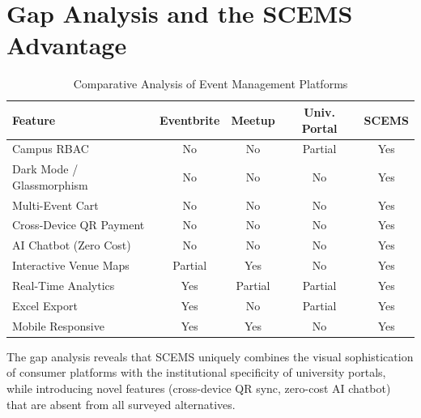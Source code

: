 \documentclass[12pt,a4paper]{report}
\begin{document}
\section{Gap Analysis and the SCEMS Advantage}

\begin{table}[H]
\centering
\caption{Comparative Analysis of Event Management Platforms}
\label{tab:gap_analysis}
\begin{tabular}{|l|c|c|c|c|}
\hline
\textbf{Feature} & \textbf{Eventbrite} & \textbf{Meetup} & \textbf{Univ. Portal} & \textbf{SCEMS} \\
\hline
Campus RBAC & No & No & Partial & Yes \\
\hline
Dark Mode / Glassmorphism & No & No & No & Yes \\
\hline
Multi-Event Cart & No & No & No & Yes \\
\hline
Cross-Device QR Payment & No & No & No & Yes \\
\hline
AI Chatbot (Zero Cost) & No & No & No & Yes \\
\hline
Interactive Venue Maps & Partial & Yes & No & Yes \\
\hline
Real-Time Analytics & Yes & Partial & Partial & Yes \\
\hline
Excel Export & Yes & No & Partial & Yes \\
\hline
Mobile Responsive & Yes & Yes & No & Yes \\
\hline
\end{tabular}
\end{table}

The gap analysis reveals that SCEMS uniquely combines the visual sophistication of consumer platforms with the institutional specificity of university portals, while introducing novel features (cross-device QR sync, zero-cost AI chatbot) that are absent from all surveyed alternatives.
\end{document}
